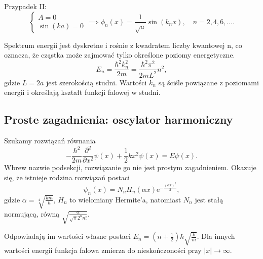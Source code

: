 Przypadek II:
\begin{equation*}
	\begin{cases}
		A = 0\\
		\sin(ka) = 0
	\end{cases}
	\implies
	\phi_n(x) = \frac{1}{\sqrt{a}} \sin(k_n x), \quad n = 2, 4, 6, \dots.
\end{equation*}

Spektrum energii jest dyskretne i rośnie z kwadratem liczby kwantowej n, co oznacza, że
cząstka może zajmować tylko określone poziomy energetyczne.
\begin{equation*}
	E_n = \frac{\hbar^2k_n^2}{2m} = \frac{\hbar^2\pi^2}{2mL^2}n^2,
\end{equation*}
gdzie $L = 2a$ jest szerokością studni. Wartości $k_n$ są ściśle powiązane
z poziomami energii i określają kształt funkcji falowej w studni.
\subsection{Proste zagadnienia: oscylator harmoniczny}

Szukamy rozwiązań równania
\begin{equation*}
	-\frac{\hbar^2}{2m} \frac{\partial^2}{\partial x^2} \psi(x) + \frac12kx^2\psi(x) = E\psi(x).
\end{equation*}
Wbrew nazwie podsekcji, rozwiązanie go nie jest prostym zagadnieniem. Okazuje się, że istnieje rodzina rozwiązań postaci
\begin{equation*}
	\psi_n(x) = N_n H_n(\alpha x) \mathrm{e}^{-\frac{(\alpha x)^2}{2}},
\end{equation*} 
gdzie $\alpha = \sqrt[4]{\frac{km}{\hbar}}$, $H_n$ to wielomiany Hermite'a, natomiast $N_n$ jest stałą normującą, równą $\sqrt{\frac{\alpha}{\sqrt{\pi} 2^n n!}}$.

Odpowiadają im wartości własne postaci $E_n = \left(n + \frac12\right) \hbar \sqrt{\frac{k}{m}}$. Dla innych wartości energii funkcja falowa zmierza do nieskończoności przy $|x| \to \infty$.

